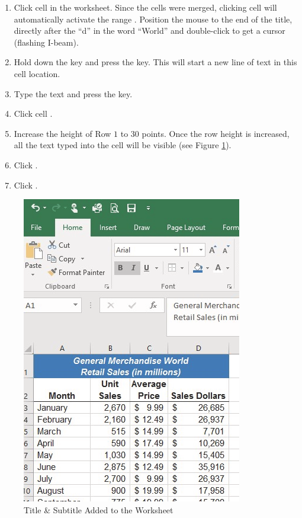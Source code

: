 \begin{enumbox}
	\begin{enumerate}
		\item Click cell  in the  worksheet. Since the cells were merged, clicking cell  will automatically activate the range . Position the mouse to the end of the title, directly after the ``d'' in the word ``World'' and double-click to get a cursor (flashing I-beam).
		\item Hold down the  key and press the  key. This will start a new line of text in this cell location.
		\item Type the text  and press the  key.
		\item Click cell . 
		\item Increase the height of Row $ 1 $ to $ 30 $ points. Once the row height is increased, all the text typed into the cell will be visible (see Figure \ref{01:fig41}).
		\item Click .
		\item Click .
	\end{enumerate}
\end{enumbox}

\begin{figure}[H]
	\centering
	\includegraphics[width=\maxwidth{.95\linewidth}]{gfx/ch01_fig41}
	\caption{Title \& Subtitle Added to the Worksheet}
	\label{01:fig41}
\end{figure}

